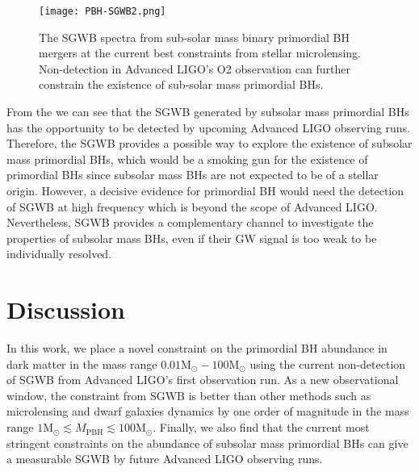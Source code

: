 \begin{figure}[htbp]
	\centering
	\texttt{[image: PBH-SGWB2.png]}
	\caption{
		The \ac{SGWB} spectra from sub-solar mass binary primordial \ac{BH} mergers at the current best constraints from stellar microlensing.
		Non-detection in Advanced LIGO's O2 observation can further constrain the existence of sub-solar mass primordial \acp{BH}.
	}
	\label{fig:ogwfm}
\end{figure}

From the  we can see that the \ac{SGWB} generated by subsolar mass primordial \acp{BH} has the opportunity to be detected by upcoming Advanced LIGO observing runs.
Therefore, the SGWB provides a possible way to explore the existence of subsolar mass primordial \acp{BH}, which would be a smoking gun for the existence of primordial \acp{BH} since subsolar mass \acp{BH} are not expected to be of a stellar origin. 
However, a decisive evidence for primordial \ac{BH} would need the detection of \ac{SGWB} at high frequency which is beyond the scope of Advanced LIGO.
Nevertheless, \ac{SGWB} provides a complementary channel to investigate the properties of subsolar mass \acp{BH}, even if their \ac{GW} signal is too weak to be individually resolved.

\section{Discussion} 
\noindent In this work, we place a novel constraint on the primordial \ac{BH} abundance in dark matter in the mass range $0.01\mathrm{M}_\odot -100\mathrm{M}_\odot$ using the current non-detection of \ac{SGWB} from Advanced LIGO's first observation run.
As a new observational window, the constraint from \ac{SGWB} is better than other methods such as microlensing and dwarf galaxies dynamics by one order of magnitude in the mass range $1 \mathrm{M}_\odot \lesssim M_\text{PBH}\lesssim 100 \mathrm{M}_\odot$.
Finally, we also find that the current most stringent constraints on the abundance of subsolar mass primordial \acp{BH} can give a measurable \ac{SGWB} by future Advanced LIGO observing runs.

